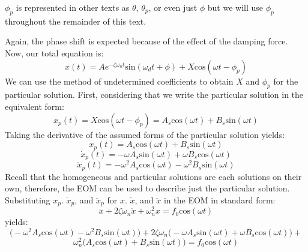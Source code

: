 \documentclass[12pt,letter]{article}
\begin{document}
	\begin{note}
		$\phi_p$ is represented in other texts as $\theta$, $\theta_p$, or even just $\phi$ but we will use $\phi_p$ throughout the remainder of this text. 
	\end{note}

	Again, the phase shift is expected because of the effect of the damping force. Now, our total equation is:
	\begin{equation}
		x(t) = Ae^{-\zeta \omega_n t}\text{sin}(\omega_d t + \phi) +  X \text{cos}(\omega t - \phi_p)
	\end{equation}			
	We can use the method of undetermined coefficients to obtain $X$ and $\phi_p$ for the particular solution. First, considering that we write the particular solution in the equivalent form:
	\begin{equation}
		x_p(t) = X \text{cos}(\omega t - \phi_p) = A_s \text{cos}(\omega t) + B_s  \text{sin}(\omega t)
	\end{equation}			 
	Taking the derivative of the assumed forms of the particular solution yields:
	\begin{equation}
		x_p(t) = A_s \text{cos}(\omega t) + B_s  \text{sin}(\omega t)
	\end{equation}	
	\begin{equation}
		\dot{x}_p(t) = -\omega A_s \text{sin}(\omega t) + \omega B_s  \text{cos}(\omega t)
	\end{equation}				 
	\begin{equation}
		\ddot{x}_p(t) = -\omega^2 A_s \text{cos}(\omega t) - \omega^2 B_s  \text{sin}(\omega t)
	\end{equation}				
	Recall that the homogeneous and particular solutions are each solutions on their own, therefore, the EOM can be used to describe just the particular solution. Substituting $x_p$. $\dot{x}_p$, and $\ddot{x}_p$ for $x$. $\dot{x}$, and $\ddot{x}$ in the EOM in standard form:
	\begin{equation}
	 	\ddot{x}+2 \zeta \omega_n \dot{x} +\omega_n^2x = f_0\text{cos}(\omega t)
	\end{equation}
	yields:
	\begin{equation}
	 	\big(	-\omega^2 A_s \text{cos}(\omega t) - \omega^2 B_s  \text{sin}(\omega t) \big)+2 \zeta \omega_n  \big( -\omega A_s \text{sin}(\omega t) + \omega B_s  \text{cos}(\omega t)  \big) +
	\end{equation}
	\begin{equation*}
		\omega_n^2 \big( A_s \text{cos}(\omega t) + B_s  \text{sin}(\omega t) \big) = f_0\text{cos}(\omega t)
	\end{equation*}				
\end{document}
